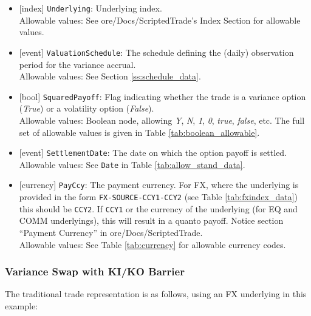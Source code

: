 \begin{itemize}
  \item{}[index] \lstinline!Underlying!: Underlying index. \\
  Allowable values: See ore/Docs/ScriptedTrade's Index Section for allowable values.
  \item{}[event] \lstinline!ValuationSchedule!: The schedule defining the (daily) observation period for the variance accrual. \\
  Allowable values: See Section \ref{ss:schedule_data}.
  \item{}[bool] \lstinline!SquaredPayoff!: Flag indicating whether the trade is a variance option (\emph{True}) or a volatility
  option (\emph{False}). \\
  Allowable values: Boolean node, allowing \emph{Y}, \emph{N}, \emph{1}, \emph{0}, \emph{true}, \emph{false}, etc.
  The full set of allowable values is given in Table \ref{tab:boolean_allowable}.
  \item{}[event] \lstinline!SettlementDate!: The date on which the option payoff is settled. \\
  Allowable values: See \lstinline!Date! in Table \ref{tab:allow_stand_data}.
  \item{}[currency] \lstinline!PayCcy!: The payment currency. For FX, where the underlying is provided
      in the form \lstinline!FX-SOURCE-CCY1-CCY2! (see Table \ref{tab:fxindex_data}) this should
      be \lstinline!CCY2!. If \lstinline!CCY1! or the currency of the underlying (for EQ and
      COMM underlyings), this will result in a quanto payoff. Notice section ``Payment Currency'' in ore/Docs/ScriptedTrade. \\
        Allowable values: See Table \ref{tab:currency}  for allowable currency codes.
\end{itemize}

\subsubsection*{Variance Swap with KI/KO Barrier}

The traditional trade representation is as follows, using an FX underlying in this example:

